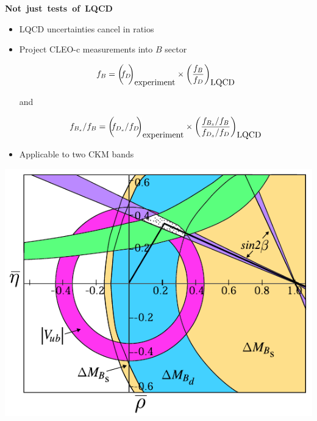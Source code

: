 \documentclass[landscape]{article}
\newenvironment{slide}[1][ ]{\mbox{\bf \boldmath #1 } \vfill}{\vfill \vspace{-1.5 cm} \mbox{ } \pagebreak}
\newenvironment{itemizer}[1]{\begin{itemize}\setlength{\itemsep}{#1}}{\end{itemize}}
\newcommand{\mathhie}{{\color{white} \frac{!}{!} \mbox{\hspace{-0.3 cm}}}}
\begin{document}
\begin{slide}[Not just tests of LQCD]

\begin{itemizer}{0.5 cm}

  \item LQCD uncertainties cancel in ratios

  \item Project CLEO-c measurements into $B$ sector

\[ f_B = \left(\mathhie f_D \mathhie\right)_{\mbox{experiment}} \times \left(\frac{f_B}{f_D}\right)_{\mbox{LQCD}} \]

and

\[ f_{B_s}/f_B = \left(\mathhie f_{D_s}/f_D \mathhie\right)_{\mbox{experiment}} \times \left(\frac{f_{B_s}/f_B}{f_{D_s}/f_D}\right)_{\mbox{LQCD}} \]

\end{itemizer}

\begin{minipage}{0.48\linewidth}
  \begin{itemize}
  \item Applicable to two CKM bands
  \end{itemize}
\end{minipage} \hfill \begin{minipage}{0.4\linewidth}
  \includegraphics[width=\linewidth]{../ckm04}
\end{minipage}

\end{slide}
\end{document}
